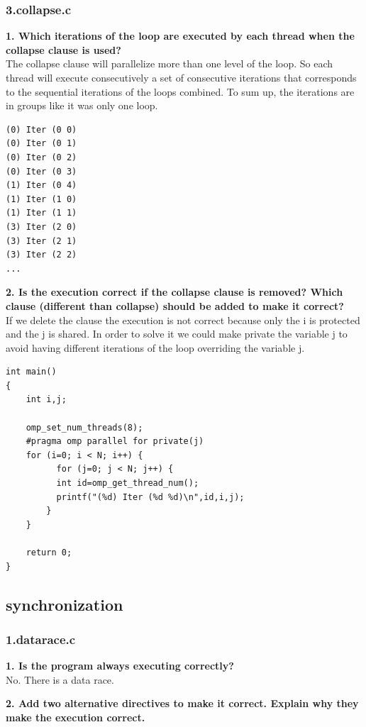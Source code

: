 \documentclass[12]{article}
\begin{document}
\subsubsection{3.collapse.c}
\textbf{1. Which iterations of the loop are executed by each thread when the collapse clause is used?}
\\
The collapse clause will parallelize more than one level of the loop. So each thread will execute consecutively a set of consecutive iterations that corresponds to the sequential iterations of the loops combined. To sum up, the iterations are in groups like it was only one loop. 
\\
\begin{lstlisting}[frame=single]
(0) Iter (0 0)
(0) Iter (0 1)
(0) Iter (0 2)
(0) Iter (0 3)
(1) Iter (0 4)
(1) Iter (1 0)
(1) Iter (1 1)
(3) Iter (2 0)
(3) Iter (2 1)
(3) Iter (2 2)
...
\end{lstlisting}
\textbf{2. Is the execution correct if the collapse clause is removed? Which clause (different than
collapse) should be added to make it correct?}
\\
If we delete the clause the execution is not correct because only the i is protected and the j is shared. In order to solve it we could make private the variable j to avoid having different iterations of the loop overriding the variable j.
\\
\begin{lstlisting}[frame=single]
int main()
{
    int i,j;

    omp_set_num_threads(8);
    #pragma omp parallel for private(j)
    for (i=0; i < N; i++) {
          for (j=0; j < N; j++) {
          int id=omp_get_thread_num();
          printf("(%d) Iter (%d %d)\n",id,i,j);
        }
    }

    return 0;
}

\end{lstlisting}
 
\subsection{synchronization}
\subsubsection{1.datarace.c} 
\textbf{1. Is the program always executing correctly?}
\\
No. There is a data race.
\\
\medskip

\textbf{2. Add two alternative directives to make it correct. Explain why they make the execution correct.}
\\
\medskip
\end{document}
